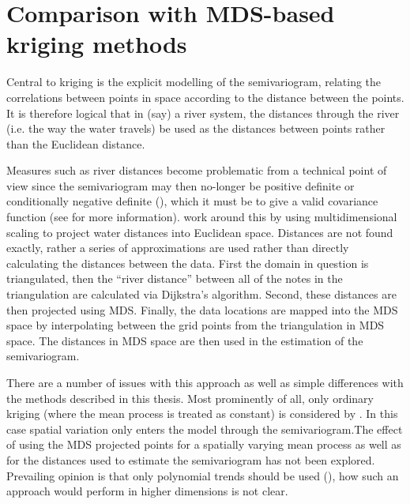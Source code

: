 \section{Comparison with MDS-based kriging methods}
\label{gds-krig}

Central to kriging is the explicit modelling of the semivariogram, relating the correlations between points in space according to the distance between the points. It is therefore logical that in (say) a river system, the distances through the river (i.e. the way the water travels) be used as the distances between points rather than the Euclidean distance. 

Measures such as river distances become problematic from a technical point of view since the semivariogram may then no-longer be positive definite or conditionally negative definite (), which it must be to give a valid covariance function (see \cite[p. 47]{diggle} for more information).   work around this by using multidimensional scaling to project water distances into Euclidean space. Distances are not found exactly, rather a series of approximations are used rather than directly calculating the distances between the data. First the domain in question is triangulated, then the ``river distance'' between all of the notes in the triangulation are calculated via Dijkstra's algorithm. Second, these distances are then projected using MDS. Finally, the data locations are mapped into the MDS space by interpolating between the grid points from the triangulation in MDS space.  The distances in MDS space are then used in the estimation of the semivariogram.

There are a number of issues with this approach as well as simple differences with the methods described in this thesis. Most prominently of all, only ordinary kriging (where the mean process is treated as constant) is considered by . In this case spatial variation only enters the model through the semivariogram.The effect of using the MDS projected points for a spatially varying mean process as well as for the distances used to estimate the semivariogram has not been explored. Prevailing opinion is that only polynomial trends should be used (\cite[p. 57]{diggle}), how such an approach would perform in higher dimensions is not clear.

